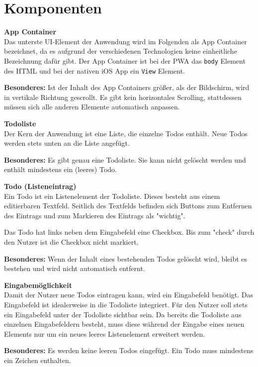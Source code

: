 \section{Komponenten}
\begin{description}
    \item \textbf{App Container}\\
    Das unterste UI-Element der Anwendung wird im Folgenden als App Container bezeichnet, da es aufgrund der verschiedenen Technologien keine einheitliche Bezeichnung dafür gibt. Der App Container ist bei der PWA das \texttt{body} Element des HTML und bei der nativen iOS App ein \texttt{View} Element.
    
    \textbf{Besonderes:} Ist der Inhalt des App Containers größer, als der Bildschirm, wird in vertikale Richtung gescrollt. Es gibt kein horizontales Scrolling, stattdessen müssen sich alle anderen Elemente automatisch anpassen.

    \item \textbf{Todoliste}\\
    Der Kern der Anwendung ist eine Liste, die einzelne Todos enthält. Neue Todos werden stets unten an die Liste angefügt.
    
    \textbf{Besonderes:} Es gibt genau eine Todoliste. Sie kann nicht gelöscht werden und enthält mindestens ein (leeres) Todo.
    
    \item \textbf{Todo (Listeneintrag)}\\
    Ein Todo ist ein Listenelement der Todoliste. Dieses besteht aus einem editierbaren Textfeld. Seitlich des Textfelds befinden sich Buttons zum Entfernen des Eintrags und zum Markieren des Eintrags als "wichtig".
    
    Das Todo hat links neben dem Eingabefeld eine Checkbox. Bis zum "check" durch den Nutzer ist die Checkbox nicht markiert.
    
    \textbf{Besonderes:} Wenn der Inhalt eines bestehenden Todos gelöscht wird, bleibt es bestehen und wird nicht automatisch entfernt.
    
    \item \textbf{Eingabemöglichkeit}\\
    Damit der Nutzer neue Todos eintragen kann, wird ein Eingabefeld benötigt. Das Eingabefeld ist idealerweise in die Todoliste integriert. Für den Nutzer soll stets ein Eingabefeld unter der Todoliste sichtbar sein.
    Da bereits die Todoliste aus einzelnen Eingabefeldern besteht, muss diese während der Eingabe eines neuen Elements nur um ein neues leeres Listenelement erweitert werden.
    
    \textbf{Besonderes:} Es werden keine leeren Todos eingefügt. Ein Todo muss mindestens ein Zeichen enthalten.
\end{description}

